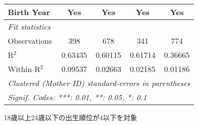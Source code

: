 \documentclass{article}
\begin{document}
\begin{landscape}
\begin{threeparttable}[b]
\begin{tabular}{lcccc}
      Birth Year                                    & Yes           & Yes           & Yes     & Yes\\  
      \midrule
      \emph{Fit statistics}\\
      Observations                                  & 398           & 678           & 341     & 774\\  
      R$^2$                                         & 0.63435       & 0.60115       & 0.61714 & 0.36665\\  
      Within R$^2$                                  & 0.09537       & 0.02663       & 0.02185 & 0.01186\\  
      \midrule \midrule
      \multicolumn{5}{l}{\emph{Clustered (Mother ID) standard-errors in parentheses}}\\
      \multicolumn{5}{l}{\emph{Signif. Codes: ***: 0.01, **: 0.05, *: 0.1}}\\
   \end{tabular}
   
   \begin{tablenotes}\item 18歳以上24歳以下の出生順位が4以下を対象
   \end{tablenotes}
\end{threeparttable}
\par\endgroup


\end{landscape}
\end{document}
